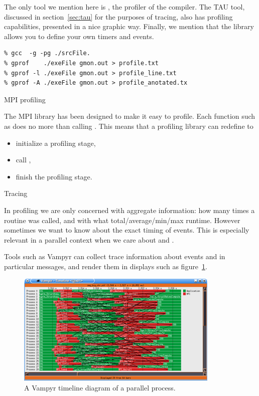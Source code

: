 The only tool we mention here is , the profiler of
the  compiler. The TAU tool, discussed in section~\ref{sec:tau}
for the purposes of tracing,
also has profiling capabilities, presented in a nice graphic way.
Finally, we mention that the  library
allows you to define your own timers and events.

\begin{verbatim}
% gcc  -g -pg ./srcFile.
% gprof    ./exeFile gmon.out > profile.txt
% gprof -l ./exeFile gmon.out > profile_line.txt
% gprof -A ./exeFile gmon.out > profile_anotated.tx
\end{verbatim}

 {MPI profiling}

The MPI library has been designed to make it easy to profile. Each
function such as  does no more than calling
. This means that a profiling library can redefine
 to
\begin{itemize}
\item initialize a profiling stage,\item call , \item
  finish the profiling stage.
\end{itemize}

 {Tracing}

In profiling we are only concerned with aggregate information: how
many times a routine was called, and with what total/average/min/max
runtime. However sometimes we want to know about the exact timing of
events. This is especially relevant in a parallel context when we care
about  and .

Tools such as Vampyr can collect trace information about
events and in particular messages, and render them in displays such as
figure~\ref{fig:vampyr}.
\begin{figure}[ht]
  \includegraphics{graphics/vampyrtrace}
  \caption{A Vampyr timeline diagram of a parallel process.}
  \label{fig:vampyr}
\end{figure}

